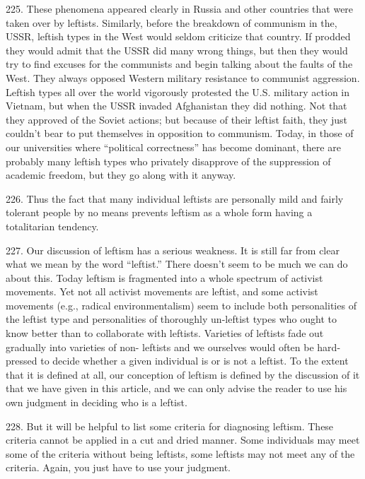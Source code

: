 \documentclass{article}
\begin{document}
225. These phenomena appeared clearly in Russia and other countries that were taken over by 
leftists. Similarly, before the breakdown of communism in the, USSR, leftish types in the West 
would seldom criticize that country. If prodded they would admit that the USSR did many wrong 
things, but then they would try to find excuses for the communists and begin talking about the 
faults of the West. They always opposed Western military resistance to communist 
aggression. Leftish types all over the world vigorously protested the U.S. military action in 
Vietnam, but when the USSR invaded Afghanistan they did nothing. Not that they approved of 
the Soviet actions; but because of their leftist faith, they just couldn’t bear to put themselves in 
opposition to communism. Today, in those of our universities where “political correctness” has 
become dominant, there are probably many leftish types who privately disapprove of the 
suppression of academic freedom, but they go along with it anyway. \vspace{\baselineskip}

226. Thus the fact that many individual leftists are personally mild and fairly tolerant people by 
no means prevents leftism as a whole form having a totalitarian tendency. \vspace{\baselineskip} \newpage

227. Our discussion of leftism has a serious weakness. It is still far from clear what we mean by 
the word “leftist.” There doesn’t seem to be much we can do about this. Today leftism is 
fragmented into a whole spectrum of activist movements. Yet not all activist movements are 
leftist, and some activist movements (e.g., radical environmentalism) seem to include both 
personalities of the leftist type and personalities of thoroughly un-leftist types who ought to know 
better than to collaborate with leftists. Varieties of leftists fade out gradually into varieties of non-
leftists and we ourselves would often be hard-pressed to decide whether a given individual is or is 
not a leftist. To the extent that it is defined at all, our conception of leftism is defined by the 
discussion of it that we have given in this article, and we can only advise the reader to use his own 
judgment in deciding who is a leftist. \vspace{\baselineskip}

228. But it will be helpful to list some criteria for diagnosing leftism. These criteria cannot be 
applied in a cut and dried manner. Some individuals may meet some of the criteria without being 
leftists, some leftists may not meet any of the criteria. Again, you just have to use your judgment. \vspace{\baselineskip}
\end{document}
